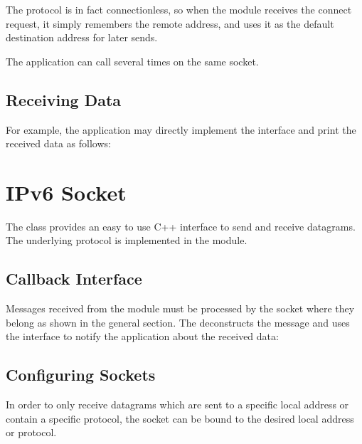 
The  protocol is in fact connectionless, so when the
 module receives the connect request, it simply remembers the
remote address, and uses it as the default destination address for later sends.

The application can call  several times on the same socket.

\subsection*{Receiving Data}

For example, the application may directly implement the
 interface and print the received data as
follows:


\section{IPv6 Socket}
\label{sec:sockets:ipv6-socket}

The  class provides an easy to use C++ interface to send
and receive  datagrams. The underlying  protocol
is implemented in the  module.

\subsection*{Callback Interface}

Messages received from the  module must be processed by the socket
where they belong as shown in the general section. The 
deconstructs the message and uses the  interface
to notify the application about the received data:


\subsection*{Configuring Sockets}

In order to only receive  datagrams which are sent to a specific
local address or contain a specific protocol, the socket can be bound to the
desired local address or protocol.

